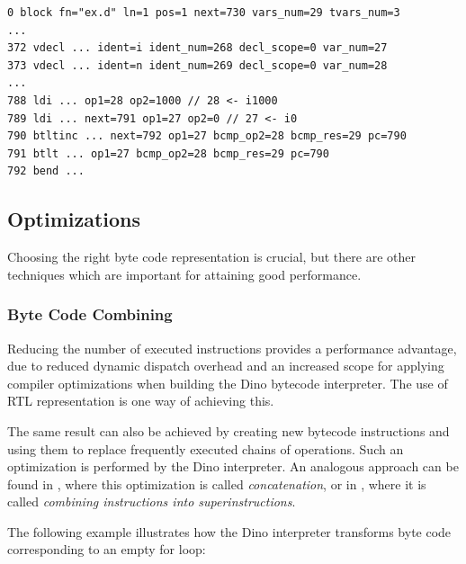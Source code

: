 \documentclass[preprint]{sigplanconf}
\begin{document}
{\scriptsize
\begin{verbatim}
0 block fn="ex.d" ln=1 pos=1 next=730 vars_num=29 tvars_num=3
...
372 vdecl ... ident=i ident_num=268 decl_scope=0 var_num=27
373 vdecl ... ident=n ident_num=269 decl_scope=0 var_num=28
...
788 ldi ... op1=28 op2=1000 // 28 <- i1000
789 ldi ... next=791 op1=27 op2=0 // 27 <- i0
790 btltinc ... next=792 op1=27 bcmp_op2=28 bcmp_res=29 pc=790
791 btlt ... op1=27 bcmp_op2=28 bcmp_res=29 pc=790
792 bend ...
\end{verbatim}
}


\subsection{Optimizations}

  Choosing the right byte code representation is
crucial, but there are other techniques %
which are important for attaining good performance.

\subsubsection{Byte Code Combining}

  Reducing the number of executed instructions provides a performance advantage,
due to reduced dynamic dispatch overhead and an
increased scope for applying compiler optimizations when building the Dino bytecode interpreter. The use of RTL representation is one way of achieving this.

  The same result can also be achieved by creating new bytecode instructions and using them to 
replace frequently executed chains of operations. Such an optimization
is performed by the Dino interpreter. An analogous approach can be found in
\cite{Abdelrahman}, where this optimization is called \emph{concatenation}, or in
\cite{Casey}, where it is called \emph{combining instructions into superinstructions}.

The following example illustrates how the Dino interpreter transforms byte code
corresponding to an empty for loop:
\end{document}
